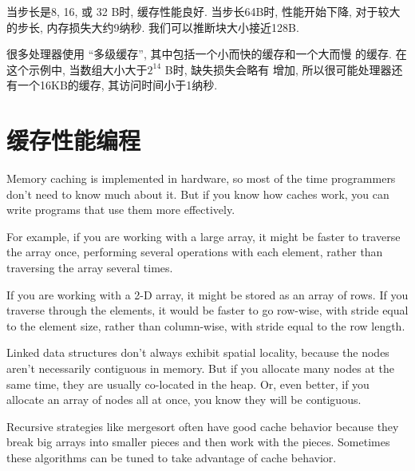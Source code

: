 \documentclass[12pt]{book}
\begin{document}
{%
当步长是8, 16, 或 32 B时, 缓存性能良好. 当步长64B时, 性能开始下降, 
对于较大的步长, 内存损失大约9纳秒. 我们可以推断块大小接近128B. 

很多处理器使用 ``多级缓存'',  其中包括一个小而快的缓存和一个大而慢
的缓存. 在这个示例中, 当数组大小大于$2^{14}$ B时, 缺失损失会略有
增加, 所以很可能处理器还有一个16KB的缓存, 其访问时间小于1纳秒.


\section{缓存性能编程}

Memory caching is implemented in hardware, so most of the time
programmers don't need to know much about it.  But if you know how
caches work, you can write programs that use them more effectively.

For example, if you are working with a large array, it might be
faster to traverse the array once, performing several operations with
each element, rather than traversing the array several times.

If you are working with a 2-D array, it might be stored as an array
of rows.  If you traverse through the elements, it would be faster
to go row-wise, with stride equal to the element size, rather
than column-wise, with stride equal to the row length.

Linked data structures don't always exhibit spatial locality, because
the nodes aren't necessarily contiguous in memory.  But if you allocate
many nodes at the same time, they are usually co-located in the heap.
Or, even better, if you allocate an array of nodes all at once, you
know they will be contiguous.

Recursive strategies like mergesort often have good cache behavior
because they break big arrays into smaller pieces and then work
with the pieces.  Sometimes these algorithms can be tuned to take
advantage of cache behavior.

}
\end{document}
